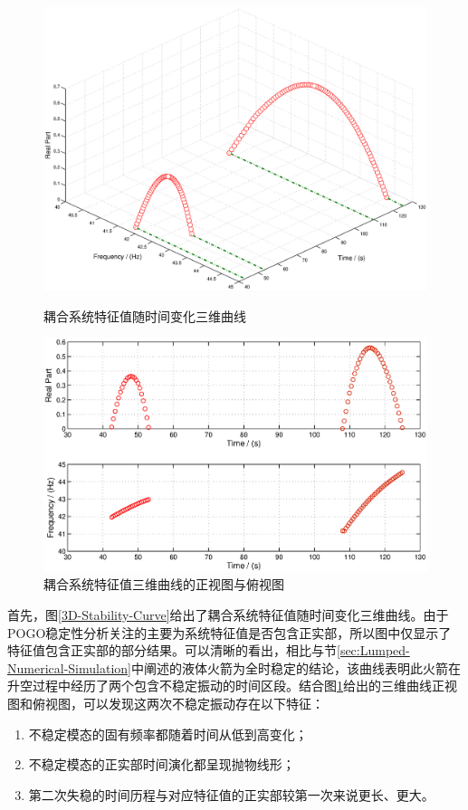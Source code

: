 \begin{figure}[p]
  \centering
  \includegraphics[width=\linewidth]{3D-Stability-Curve}
  \caption{耦合系统特征值随时间变化三维曲线}\label{3D-Stability-Curve}
  \includegraphics[width=\linewidth]{3D-Stability-Real-Imag}
  \caption{耦合系统特征值三维曲线的正视图与俯视图}\label{3D-Stability-Real-Imag}
\end{figure}

首先，图\ref{3D-Stability-Curve}给出了耦合系统特征值随时间变化三维曲线。由于POGO稳定性分析关注的主要为系统特征值是否包含正实部，所以图中仅显示了特征值包含正实部的部分结果。可以清晰的看出，相比与节\ref{sec:Lumped-Numerical-Simulation}中阐述的液体火箭为全时稳定的结论，该曲线表明此火箭在升空过程中经历了两个包含不稳定振动的时间区段。结合图\ref{3D-Stability-Real-Imag}给出的三维曲线正视图和俯视图，可以发现这两次不稳定振动存在以下特征：
\begin{enumerate}
	\item 不稳定模态的固有频率都随着时间从低到高变化；
	\item 不稳定模态的正实部时间演化都呈现抛物线形；
	\item 第二次失稳的时间历程与对应特征值的正实部较第一次来说更长、更大。
\end{enumerate}

